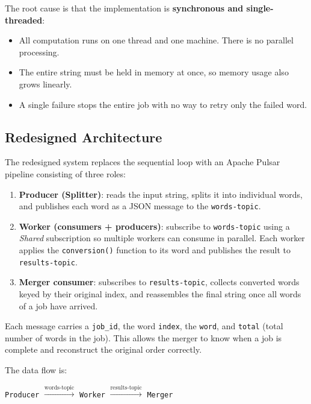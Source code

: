 \documentclass[11pt,a4paper]{article}
\begin{document}
The root cause is that the implementation is \textbf{synchronous and single-threaded}:

\begin{itemize}[leftmargin=1.5cm]
  \item All computation runs on one thread and one machine. There is no parallel processing.
  \item The entire string must be held in memory at once, so memory usage also grows linearly.
  \item A single failure stops the entire job with no way to retry only the failed word.
\end{itemize}

\subsection{Redesigned Architecture}

The redesigned system replaces the sequential loop with an Apache Pulsar pipeline consisting
of three roles:

\begin{enumerate}[leftmargin=1.5cm]
  \item \textbf{Producer (Splitter)}: reads the input string, splits it into individual words,
        and publishes each word as a JSON message to the \texttt{words-topic}.
  \item \textbf{Worker (consumers + producers)}: subscribe to \texttt{words-topic} using a
        \textit{Shared} subscription so multiple workers can consume in parallel. Each worker
        applies the \texttt{conversion()} function to its word and publishes the result to
        \texttt{results-topic}.
  \item \textbf{Merger consumer}: subscribes to \texttt{results-topic}, collects converted
        words keyed by their original index, and reassembles the final string once all words of
        a job have arrived.
\end{enumerate}

Each message carries a \texttt{job\_id}, the word \texttt{index}, the \texttt{word}, and
\texttt{total} (total number of words in the job). This allows the merger to know when a job
is complete and reconstruct the original order correctly.

The data flow is:

\begin{center}
  \texttt{Producer} $\xrightarrow{\text{words-topic}}$ \texttt{Worker} $\xrightarrow{\text{results-topic}}$ \texttt{Merger}
\end{center}
\end{document}
